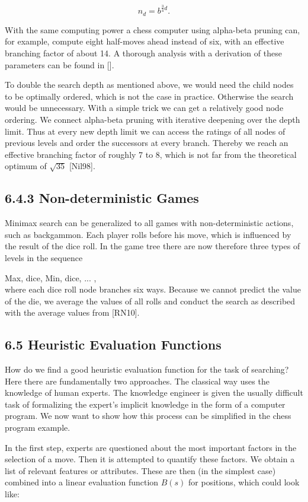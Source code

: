 \documentclass[10pt]{article}
\begin{document}
$$
n_{d}=b^{\frac{3}{4} d} .
$$

With the same computing power a chess computer using alpha-beta pruning can, for example, compute eight half-moves ahead instead of six, with an effective branching factor of about 14. A thorough analysis with a derivation of these parameters can be found in [\cite{pearl1984heuristics}].

To double the search depth as mentioned above, we would need the child nodes to be optimally ordered, which is not the case in practice. Otherwise the search would be unnecessary. With a simple trick we can get a relatively good node ordering. We connect alpha-beta pruning with iterative deepening over the depth limit. Thus at every new depth limit we can access the ratings of all nodes of previous levels and order the successors at every branch. Thereby we reach an effective branching factor of roughly 7 to 8, which is not far from the theoretical optimum of $\sqrt{35}$ [Nil98].

\subsection*{6.4.3 Non-deterministic Games}
Minimax search can be generalized to all games with non-deterministic actions, such as backgammon. Each player rolls before his move, which is influenced by the result of the dice roll. In the game tree there are now therefore three types of levels in the sequence

Max, dice, Min, dice, ... ,\\[0pt]
where each dice roll node branches six ways. Because we cannot predict the value of the die, we average the values of all rolls and conduct the search as described with the average values from [RN10].

\subsection*{6.5 Heuristic Evaluation Functions}
How do we find a good heuristic evaluation function for the task of searching? Here there are fundamentally two approaches. The classical way uses the knowledge of human experts. The knowledge engineer is given the usually difficult task of formalizing the expert's implicit knowledge in the form of a computer program. We now want to show how this process can be simplified in the chess program example.


In the first step, experts are questioned about the most important factors in the selection of a move. Then it is attempted to quantify these factors. We obtain a list of relevant features or attributes. These are then (in the simplest case) combined into a linear evaluation function $B(s)$ for positions, which could look like:
\end{document}
